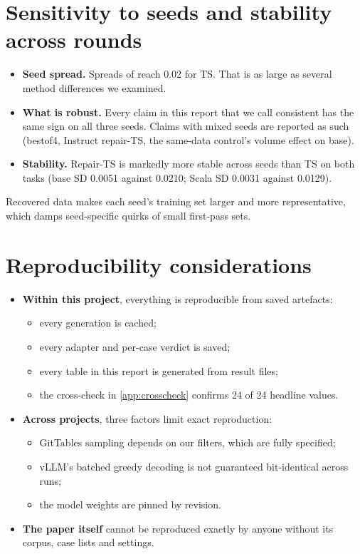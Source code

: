 \section{Sensitivity to seeds and stability across rounds}

\begin{itemize}
\item \textbf{Seed spread.} Spreads of \Mviii{} reach 0.02 for TS. That is as large as several method differences we
examined.
\item \textbf{What is robust.} Every claim in this report that we call consistent has the same sign on all three seeds.
Claims with mixed seeds are reported as such (bestof4, Instruct repair-TS, the same-data control's volume effect on
base).
\item \textbf{Stability.} Repair-TS is markedly more stable across seeds than TS on both tasks (base SD 0.0051 against
0.0210; Scala \ZSiv{} SD 0.0031 against 0.0129).
\end{itemize}

\begin{hypothesis}
Recovered data makes each seed's training set larger and more representative, which damps seed-specific quirks of
small first-pass sets.
\end{hypothesis}

\section{Reproducibility considerations}

\begin{itemize}
\item \textbf{Within this project}, everything is reproducible from saved artefacts:
  \begin{itemize}
  \item every generation is cached;
  \item every adapter and per-case verdict is saved;
  \item every table in this report is generated from result files;
  \item the cross-check in \cref{app:crosscheck} confirms 24 of 24 headline values.
  \end{itemize}
\item \textbf{Across projects}, three factors limit exact reproduction:
  \begin{itemize}
  \item GitTables sampling depends on our filters, which are fully specified;
  \item vLLM's batched greedy decoding is not guaranteed bit-identical across runs;
  \item the model weights are pinned by revision.
  \end{itemize}
\item \textbf{The paper itself} cannot be reproduced exactly by anyone without its corpus, case lists and settings.
\end{itemize}

